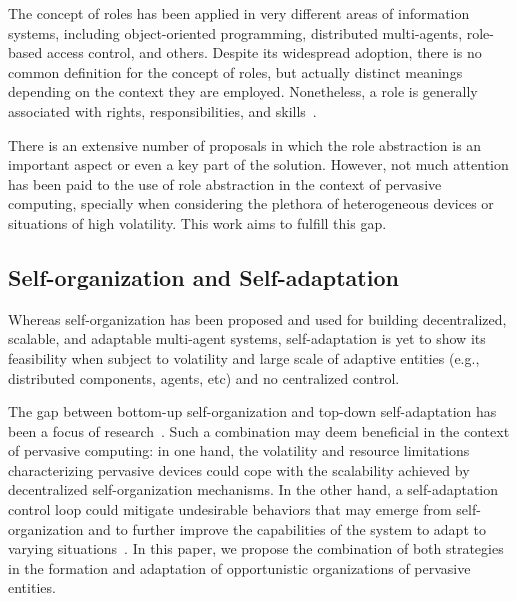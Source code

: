 

The concept of roles has been applied in very different areas of information systems, including object-oriented programming, distributed multi-agents, role-based access control, and others. Despite its widespread adoption, there is no common definition for the concept of roles, but actually distinct meanings depending on the context they are employed. Nonetheless, a role is generally associated with rights, responsibilities, and skills~\cite{}.

There is an extensive number of proposals in which the role abstraction is an important aspect or even a key part of the solution. However, not much attention has been paid to the use of role abstraction in the context of pervasive computing, specially when considering the plethora of heterogeneous devices or situations of high volatility. This work aims to fulfill this gap. %


\subsection{Self-organization and Self-adaptation}

Whereas self-organization has been proposed and used for building decentralized, scalable, and adaptable multi-agent systems, self-adaptation is yet to show its feasibility when subject to volatility and large scale of adaptive entities (e.g., distributed components, agents, etc) and no centralized control. 

The gap between bottom-up self-organization and top-down self-adaptation has been a focus of research~\cite{Kramer:, Zambonelli:, Weyns:}. Such a combination may deem beneficial in the context of pervasive computing: in one hand, the volatility and resource limitations characterizing pervasive devices could cope with the scalability achieved by decentralized self-organization mechanisms. In the other hand, a self-adaptation control loop could mitigate undesirable behaviors that may emerge from self-organization and to further improve the capabilities of the system to adapt to varying situations~\cite{Zambonelli:}. In this paper, we propose the combination of both strategies in the formation and adaptation of opportunistic organizations of pervasive entities.

